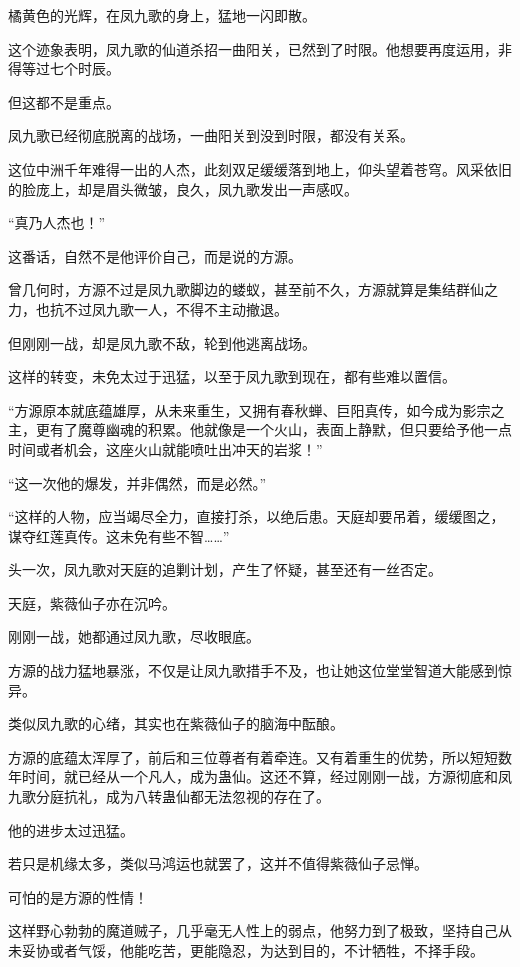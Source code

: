 
\begin{this_body}

橘黄色的光辉，在凤九歌的身上，猛地一闪即散。

这个迹象表明，凤九歌的仙道杀招一曲阳关，已然到了时限。他想要再度运用，非得等过七个时辰。

但这都不是重点。

凤九歌已经彻底脱离的战场，一曲阳关到没到时限，都没有关系。

这位中洲千年难得一出的人杰，此刻双足缓缓落到地上，仰头望着苍穹。风采依旧的脸庞上，却是眉头微皱，良久，凤九歌发出一声感叹。

“真乃人杰也！”

这番话，自然不是他评价自己，而是说的方源。

曾几何时，方源不过是凤九歌脚边的蝼蚁，甚至前不久，方源就算是集结群仙之力，也抗不过凤九歌一人，不得不主动撤退。

但刚刚一战，却是凤九歌不敌，轮到他逃离战场。

这样的转变，未免太过于迅猛，以至于凤九歌到现在，都有些难以置信。

“方源原本就底蕴雄厚，从未来重生，又拥有春秋蝉、巨阳真传，如今成为影宗之主，更有了魔尊幽魂的积累。他就像是一个火山，表面上静默，但只要给予他一点时间或者机会，这座火山就能喷吐出冲天的岩浆！”

“这一次他的爆发，并非偶然，而是必然。”

“这样的人物，应当竭尽全力，直接打杀，以绝后患。天庭却要吊着，缓缓图之，谋夺红莲真传。这未免有些不智……”

头一次，凤九歌对天庭的追剿计划，产生了怀疑，甚至还有一丝否定。

天庭，紫薇仙子亦在沉吟。

刚刚一战，她都通过凤九歌，尽收眼底。

方源的战力猛地暴涨，不仅是让凤九歌措手不及，也让她这位堂堂智道大能感到惊异。

类似凤九歌的心绪，其实也在紫薇仙子的脑海中酝酿。

方源的底蕴太浑厚了，前后和三位尊者有着牵连。又有着重生的优势，所以短短数年时间，就已经从一个凡人，成为蛊仙。这还不算，经过刚刚一战，方源彻底和凤九歌分庭抗礼，成为八转蛊仙都无法忽视的存在了。

他的进步太过迅猛。

若只是机缘太多，类似马鸿运也就罢了，这并不值得紫薇仙子忌惮。

可怕的是方源的性情！

这样野心勃勃的魔道贼子，几乎毫无人性上的弱点，他努力到了极致，坚持自己从未妥协或者气馁，他能吃苦，更能隐忍，为达到目的，不计牺牲，不择手段。


\end{this_body}
